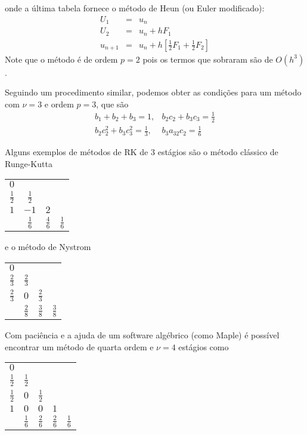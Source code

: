 onde a última tabela fornece o método de Heun (ou Euler modificado):
\begin{eqnarray}
  U_1 &=&u_n \\
  U_2 &=&u_n  + h F_1 \\
  u_{n+1}&=&u_n  + h [ \frac{1}{2} F_1+\frac{1}{2}F_2]
\end{eqnarray}
Note que o método é de ordem $p=2$ pois os termos que sobraram são de $O(h^3)$.


Seguindo um procedimento similar, podemos obter as condições para um método com $\nu =3$ e ordem $p=3$, que são
\begin{eqnarray}
  b_1+b_2+b_3=1,               & b_2c_2+b_3c_3 = \frac{1}{2} \\
  b_2c_2^2+b_3c_3^2=\frac{1}{3}, & b_3a_{32}c_2=\frac{1}{6}
\end{eqnarray}

Alguns exemplos de métodos de RK de 3 estágios são o método clássico de Runge-Kutta

\begin{tabular}{c|ccc}
  $0$ &     &   & \\
  $\frac{1}{2}$ & $\frac{1}{2}$ &   & \\
  $1$ & $-1$ &$2$& \\  \hline
      & $\frac{1}{6}$ &$\frac{4}{6}$& $\frac{1}{6}$
\end{tabular}

e o método de Nystrom

\begin{tabular}{c|ccc}
  $0$ &     &   & \\
  $\frac{2}{3}$ & $\frac{2}{3}$ &   & \\
  $\frac{2}{3}$ & $0$ &$\frac{2}{3}$& \\  \hline
      & $\frac{2}{8}$ &$\frac{3}{8}$& $\frac{3}{8}$
\end{tabular}


Com paciência e a ajuda de um software algébrico (como Maple) é possível encontrar um método de quarta ordem e $\nu =4$ estágios como


\begin{tabular}{c|cccc}
  $0$ &     &   &   &    \\
  $\frac{1}{2}$ & $\frac{1}{2}$ &   &   &    \\
  $\frac{1}{2}$ & $0$ &$\frac{1}{2}$&   &    \\
  $1$ & $0$ &$0$&$1$&    \\  \hline
      & $\frac{1}{6}$ &$\frac{2}{6}$& $\frac{2}{6}$& $\frac{1}{6}$
\end{tabular}



